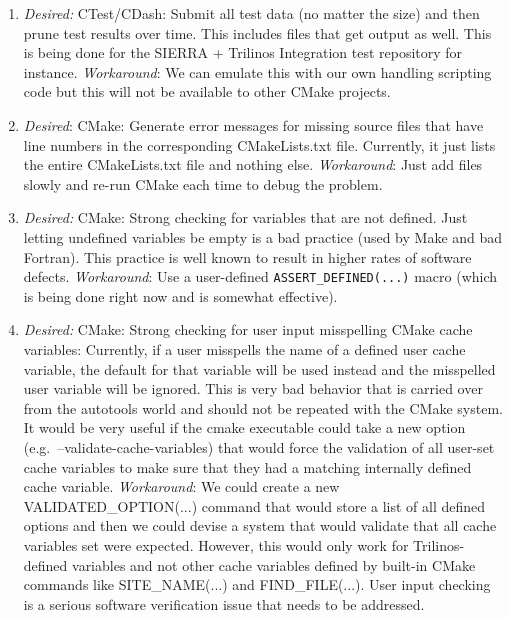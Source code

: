 \documentclass[pdf,ps2pdf,11pt]{SANDreport}
\begin{document}
\begin{enumerate}
{}\item\textit{Desired:} CTest/CDash: Submit all test data (no matter
the size) and then prune test results over time.  This includes
files that get output as well.  This is being done for the SIERRA +
Trilinos Integration test repository for instance.
{}\textit{Workaround}: We can emulate this with our own handling
scripting code but this will not be available to other CMake projects.

{}\item\textit{Desired}: CMake: Generate error messages for missing
source files that have line numbers in the corresponding
CMakeLists.txt file.  Currently, it just lists the entire
CMakeLists.txt file and nothing else.  {}\textit{Workaround}: Just add
files slowly and re-run CMake each time to debug the problem.

{}\item\textit{Desired:} CMake: Strong checking for variables that are
not defined.  Just letting undefined variables be empty is a bad
practice (used by Make and bad Fortran).  This practice is well known
to result in higher rates of software defects.  {}\textit{Workaround}:
Use a user-defined {}\texttt{ASSERT\_DEFINED(...)} macro (which is
being done right now and is somewhat effective).

{}\item\textit{Desired:} CMake: Strong checking for user input
misspelling CMake cache variables: Currently, if a user misspells the
name of a defined user cache variable, the default for that variable
will be used instead and the misspelled user variable will be ignored.
This is very bad behavior that is carried over from the autotools
world and should not be repeated with the CMake system.  It would be
very useful if the cmake executable could take a new option (e.g.\
--validate-cache-variables) that would force the validation of all
user-set cache variables to make sure that they had a matching
internally defined cache variable.  {}\textit{Workaround}: We could
create a new VALIDATED\_OPTION(...) command that would store a list of
all defined options and then we could devise a system that would
validate that all cache variables set were expected.  However, this
would only work for Trilinos-defined variables and not other cache
variables defined by built-in CMake commands like SITE\_NAME(...) and
FIND\_FILE(...).  User input checking is a serious software
verification issue that needs to be addressed.

\end{enumerate}
\end{document}
